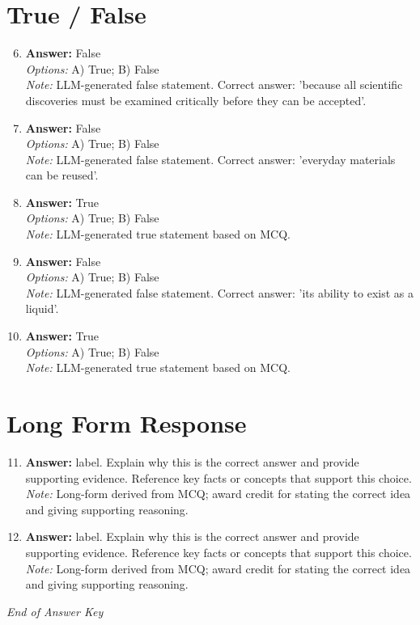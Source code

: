 \documentclass[12pt]{article}
\begin{document}
\section*{True / False}
\begin{enumerate}[label=\arabic*.]
\setcounter{enumi}{5}
\item \textbf{Answer:} False
\\ \textit{Options:} A) True; B) False
\\ \textit{Note:} LLM-generated false statement. Correct answer: 'because all scientific discoveries must be examined critically before they can be accepted'.
\item \textbf{Answer:} False
\\ \textit{Options:} A) True; B) False
\\ \textit{Note:} LLM-generated false statement. Correct answer: 'everyday materials can be reused'.
\item \textbf{Answer:} True
\\ \textit{Options:} A) True; B) False
\\ \textit{Note:} LLM-generated true statement based on MCQ.
\item \textbf{Answer:} False
\\ \textit{Options:} A) True; B) False
\\ \textit{Note:} LLM-generated false statement. Correct answer: 'its ability to exist as a liquid'.
\item \textbf{Answer:} True
\\ \textit{Options:} A) True; B) False
\\ \textit{Note:} LLM-generated true statement based on MCQ.
\end{enumerate}

\section*{Long Form Response}
\begin{enumerate}[label=\arabic*.]
\setcounter{enumi}{10}
\item \textbf{Answer:} label. Explain why this is the correct answer and provide supporting evidence. Reference key facts or concepts that support this choice.
\\ \textit{Note:} Long-form derived from MCQ; award credit for stating the correct idea and giving supporting reasoning.
\item \textbf{Answer:} label. Explain why this is the correct answer and provide supporting evidence. Reference key facts or concepts that support this choice.
\\ \textit{Note:} Long-form derived from MCQ; award credit for stating the correct idea and giving supporting reasoning.
\end{enumerate}

\vfill
\noindent\textit{End of Answer Key}
\end{document}
